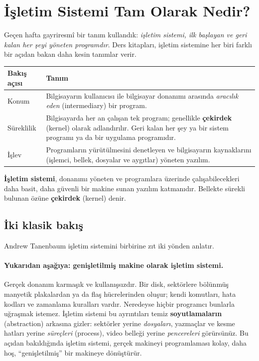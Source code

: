 \documentclass[11pt,a4paper]{article}
\newcommand{\term}[1]{\textbf{\color{mintdeep}#1}}
\begin{document}
\setcounter{tocdepth}{2}
\tableofcontents

\section{İşletim Sistemi Tam Olarak Nedir?}

Geçen hafta gayriresmî bir tanım kullandık: \emph{işletim sistemi, ilk başlayan ve geri kalan her şeyi yöneten programdır}. Ders kitapları, işletim sistemine her biri farklı bir açıdan bakan daha kesin tanımlar verir.

\begin{center}
\renewcommand{\arraystretch}{1.35}
\begin{tabularx}{\linewidth}{>{\raggedright\arraybackslash}p{3.2cm} >{\raggedright\arraybackslash}X}
\toprule
\textbf{Bakış açısı} & \textbf{Tanım} \\
\midrule
Konum & Bilgisayarın kullanıcısı ile bilgisayar donanımı arasında \emph{aracılık eden} (intermediary) bir program. \\
Süreklilik & Bilgisayarda her an çalışan tek program; genellikle \term{çekirdek} (kernel) olarak adlandırılır. Geri kalan her şey ya bir sistem programı ya da bir uygulama programıdır. \\
İşlev & Programların yürütülmesini denetleyen ve bilgisayarın kaynaklarını (işlemci, bellek, dosyalar ve aygıtlar) yöneten yazılım. \\
\bottomrule
\end{tabularx}
\end{center}

\begin{keyidea}
\textbf{İşletim sistemi}, donanımı yöneten ve programlara üzerinde çalışabilecekleri daha basit, daha güvenli bir makine sunan yazılım katmanıdır. Bellekte sürekli bulunan özüne \textbf{çekirdek} (kernel) denir.
\end{keyidea}

\subsection{İki klasik bakış}

Andrew Tanenbaum işletim sistemini birbirine zıt iki yönden anlatır.

\paragraph{Yukarıdan aşağıya: genişletilmiş makine olarak işletim sistemi.} Gerçek donanım karmaşık ve kullanışsızdır. Bir disk, sektörlere bölünmüş manyetik plakalardan ya da flaş hücrelerinden oluşur; kendi komutları, hata kodları ve zamanlama kuralları vardır. Neredeyse hiçbir programcı bunlarla uğraşmak istemez. İşletim sistemi bu ayrıntıları temiz \term{soyutlamaların} (abstraction) arkasına gizler: sektörler yerine \emph{dosyaları}, yazmaçlar ve kesme hatları yerine \emph{süreçleri} (process), video belleği yerine \emph{pencereleri} görürsünüz. Bu açıdan bakıldığında işletim sistemi, gerçek makineyi programlaması kolay, daha hoş, ``genişletilmiş'' bir makineye dönüştürür.
\end{document}
